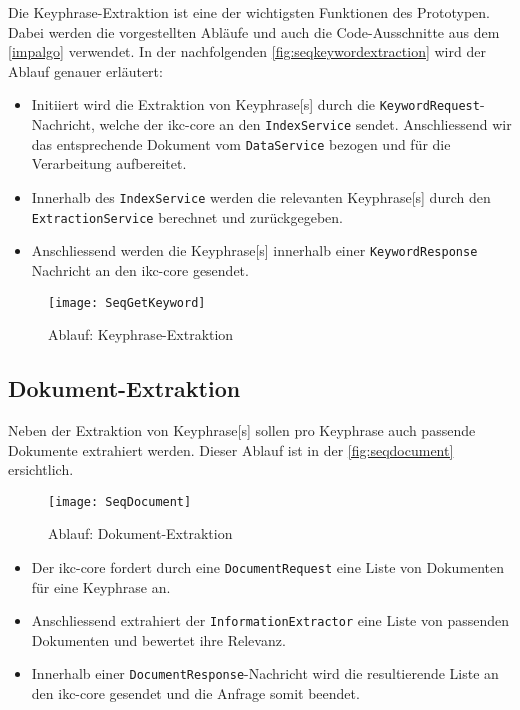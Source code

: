 Die \gls{Keyphrase}-Extraktion ist eine der wichtigsten Funktionen des Prototypen. Dabei werden die vorgestellten Abläufe und auch die Code-Ausschnitte aus dem \autoref{impalgo} verwendet. In der nachfolgenden \autoref{fig:seqkeywordextraction} wird der Ablauf genauer erläutert:
\begin{itemize}
    \item Initiiert wird die Extraktion von \gls{Keyphrase}[s] durch die \texttt{Key\-word\-Re\-qu\-est}-Nachricht, welche der \gls{ikc-core} an den \texttt{IndexService} sendet. Anschliessend wir das entsprechende Dokument vom \texttt{Da\-ta\-Ser\-vi\-ce} bezogen und für die Verarbeitung aufbereitet. 
    \item Innerhalb des \texttt{IndexService} werden die relevanten \gls{Keyphrase}[s] durch den \texttt{ExtractionService} berechnet und zurückgegeben.
    \item Anschliessend werden die \gls{Keyphrase}[s] innerhalb einer \texttt{Key\-word\-Re\-spon\-se} Nachricht an den \gls{ikc-core} gesendet.
\end{itemize}

    \begin{figure}[H]
    \centering
    \texttt{[image: SeqGetKeyword]}
    \caption{Ablauf: \gls{Keyphrase}-Extraktion}
    \label{fig:seqkeywordextraction}
    \end{figure}


\subsection{Dokument-Extraktion}



Neben der Extraktion von \gls{Keyphrase}[s] sollen pro \gls{Keyphrase} auch passende Dokumente extrahiert werden. Dieser Ablauf ist in der \autoref{fig:seqdocument} ersichtlich.

    \begin{figure}[H]
    \centering
    \texttt{[image: SeqDocument]}
    \caption{Ablauf: Dokument-Extraktion}
    \label{fig:seqdocument}
    \end{figure}

\begin{itemize}
    \item Der \gls{ikc-core} fordert durch eine \texttt{DocumentRequest} eine Liste von Dokumenten für eine \gls{Keyphrase} an. 
    \item Anschliessend extrahiert der \texttt{InformationExtractor} eine Liste von passenden Dokumenten und bewertet ihre Relevanz. 
    \item Innerhalb einer \texttt{DocumentResponse}-Nachricht wird die resultierende Liste an den \gls{ikc-core} gesendet und die Anfrage somit beendet.
\end{itemize}

